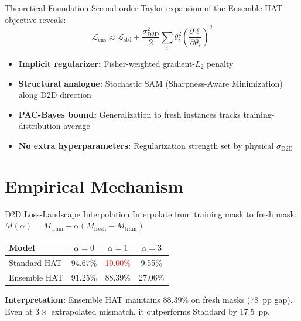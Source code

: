\documentclass[aspectratio=169,11pt]{beamer}
\begin{document}
\begin{frame}{Theoretical Foundation}
  Second-order Taylor expansion of the Ensemble HAT objective reveals:
  \begin{equation*}
    \mathcal{L}_{\text{ens}} \approx \mathcal{L}_{\text{std}} + \frac{\sigma^2_{\text{D2D}}}{2} \sum_i \theta_i^2 \left(\frac{\partial \ell}{\partial \theta_i}\right)^2
  \end{equation*}
  \vfill
  \begin{itemize}
    \item \textbf{Implicit regularizer:} Fisher-weighted gradient-$L_2$ penalty
    \item \textbf{Structural analogue:} Stochastic SAM (Sharpness-Aware Minimization) along D2D direction
    \item \textbf{PAC-Bayes bound:} Generalization to fresh instances tracks training-distribution average
    \item \textbf{No extra hyperparameters:} Regularization strength set by physical $\sigma_{\text{D2D}}$
  \end{itemize}
\end{frame}

\section{Empirical Mechanism}

\begin{frame}{D2D Loss-Landscape Interpolation}
  Interpolate from training mask to fresh mask: $M(\alpha) = M_{\text{train}} + \alpha(M_{\text{fresh}} - M_{\text{train}})$
  \vfill
  \begin{table}
    \centering
    \small
    \begin{tabular}{lccc}
      \toprule
      Model & $\alpha=0$ & $\alpha=1$ & $\alpha=3$ \\
      \midrule
      Standard HAT & 94.67\% & \textcolor{red}{10.00\%} & 9.55\% \\
      Ensemble HAT & 91.25\% & \textcolor{green!60!black}{88.39\%} & 27.06\% \\
      \bottomrule
    \end{tabular}
  \end{table}
  \vfill
  \textbf{Interpretation:} Ensemble HAT maintains 88.39\% on fresh masks (78~pp gap). Even at $3\times$ extrapolated mismatch, it outperforms Standard by 17.5~pp.
\end{frame}
\end{document}
